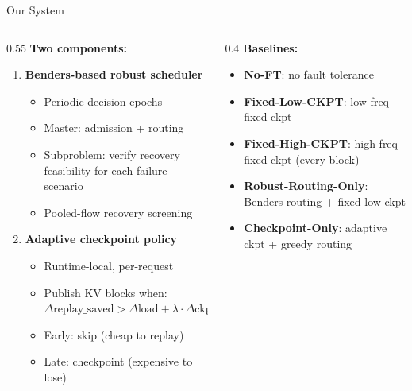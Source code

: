 \documentclass[aspectratio=169,12pt]{beamer}
\begin{document}
\begin{frame}{Our System}
\begin{columns}[T]
\begin{column}{0.55\textwidth}
\textbf{Two components:}
\begin{enumerate}
    \item \textbf{Benders-based robust scheduler}
    \begin{itemize}
        \item Periodic decision epochs
        \item Master: admission + routing
        \item Subproblem: verify recovery feasibility for each failure scenario
        \item Pooled-flow recovery screening
    \end{itemize}
    \item \textbf{Adaptive checkpoint policy}
    \begin{itemize}
        \item Runtime-local, per-request
        \item Publish KV blocks when: \\
              $\Delta\text{replay\_saved} > \Delta\text{load} + \lambda \cdot \Delta\text{ckpt\_overhead}$
        \item Early: skip (cheap to replay)
        \item Late: checkpoint (expensive to lose)
    \end{itemize}
\end{enumerate}
\end{column}
\begin{column}{0.4\textwidth}
\textbf{Baselines:}
\begin{itemize}
    \item \textbf{No-FT}: no fault tolerance
    \item \textbf{Fixed-Low-CKPT}: low-freq fixed ckpt
    \item \textbf{Fixed-High-CKPT}: high-freq fixed ckpt (every block)
    \item \textbf{Robust-Routing-Only}: Benders routing + fixed low ckpt
    \item \textbf{Checkpoint-Only}: adaptive ckpt + greedy routing
\end{itemize}
\end{column}
\end{columns}
\end{frame}
\end{document}
